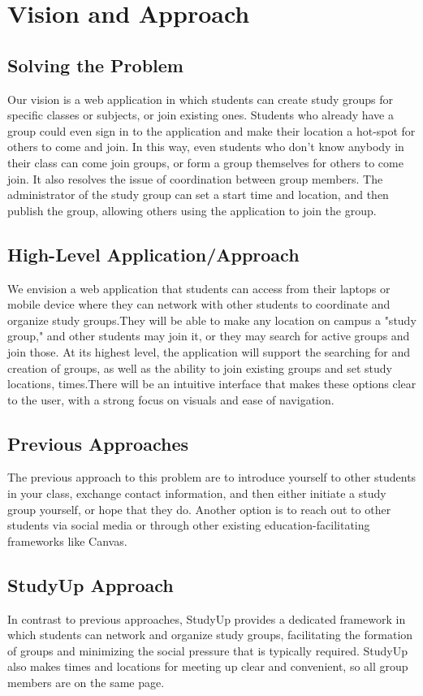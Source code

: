 \documentclass[12pt]{article}
\begin{document}
\section{Vision and Approach}
\subsection{Solving the Problem}
Our vision is a web application in which students can create study groups for specific classes or subjects, or join existing ones. Students who already have a group could even sign in to the application and make their location a hot-spot for others to come and join. In this way, even students who don't know anybody in their class can come join groups, or form a group themselves for others to come join. It also resolves the issue of coordination between group members. The administrator of the study group can set a start time and location, and then publish the group, allowing others using the application to join the group.

\subsection{High-Level Application/Approach}
We envision a web application that students can access from their laptops or mobile device where they can network with other students to coordinate and organize study groups.They will be able to make any location on campus a "study group," and other students may join it, or they may search for active groups and join those. At its highest level, the application will support the searching for and creation of groups, as well as the ability to join existing groups and set study locations, times.There will be an intuitive interface that makes these options clear to the user, with a strong focus on visuals and ease of navigation.

\subsection{Previous Approaches}
The previous approach to this problem are to introduce yourself to other students in your class, exchange contact information, and then either initiate a study group yourself, or hope that they do. Another option is to reach out to other students via social media or through other existing education-facilitating frameworks like Canvas.

\subsection{StudyUp Approach}
In contrast to previous approaches, StudyUp provides a dedicated framework in which students can network and organize study groups, facilitating the formation of groups and minimizing the social pressure that is typically required. StudyUp also makes times and locations for meeting up clear and convenient, so all group members are on the same page.
\end{document}
